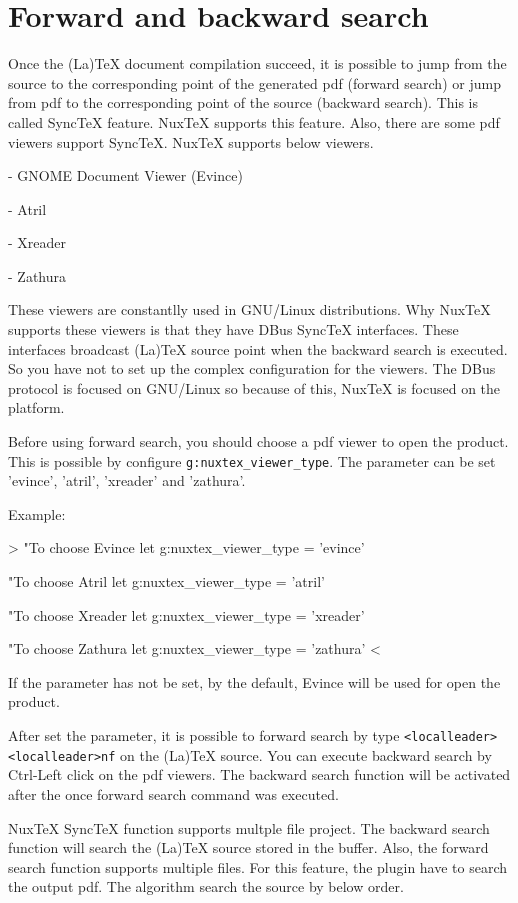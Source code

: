 \section{Forward and backward search}

Once the (La)TeX document compilation succeed, it is possible to jump from the source to the corresponding point of the generated pdf (forward search) or jump from pdf to the corresponding point of the source (backward search).
This is called SyncTeX feature. NuxTeX supports this feature. Also, there are some pdf viewers support SyncTeX. NuxTeX supports below viewers.

- GNOME Document Viewer (Evince)

- Atril

- Xreader

- Zathura

These viewers are constantlly used in GNU/Linux distributions. Why NuxTeX supports these viewers is that they have DBus SyncTeX interfaces. These interfaces broadcast (La)TeX source point when the backward search is executed.  So you have not to set up the complex configuration for the viewers. The DBus protocol is focused on GNU/Linux so because of this, NuxTeX is focused on the platform.

Before using forward search, you should choose a pdf viewer to open the product.
This is possible by configure \verb|g:nuxtex_viewer_type|. The parameter can be set 'evince', 'atril', 'xreader' and 'zathura'.

Example:
\begin{verbatim*}
>
	"To choose Evince
	let g:nuxtex_viewer_type = 'evince'

	"To choose Atril
	let g:nuxtex_viewer_type = 'atril'

	"To choose Xreader
	let g:nuxtex_viewer_type = 'xreader'

	"To choose Zathura
	let g:nuxtex_viewer_type = 'zathura'
<
\end{verbatim*}

If the parameter has not be set, by the default, Evince will be used for open the product.

After set the parameter, it is possible to forward search by type \verb|<localleader><localleader>nf| on the (La)TeX source.
You can execute backward search by Ctrl-Left click on the pdf viewers. The backward search function will be activated after the once forward search command was executed.

NuxTeX SyncTeX function supports multple file project. The backward search function will search the (La)TeX source stored in the buffer.  Also, the forward search function supports multiple files. For this feature, the plugin have to search the output pdf. The algorithm search the source by
below order.

